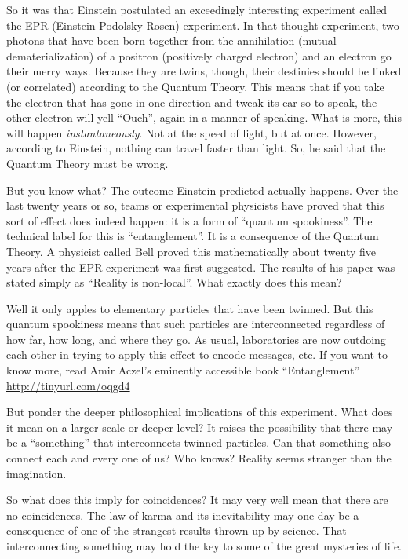 \documentclass[
  a4paper,
]{article}
\begin{document}
So it was that Einstein postulated an exceedingly interesting experiment
called the EPR (Einstein Podolsky Rosen) experiment. In that thought
experiment, two photons that have been born together from the
annihilation (mutual dematerialization) of a positron (positively
charged electron) and an electron go their merry ways. Because they are
twins, though, their destinies should be linked (or correlated)
according to the Quantum Theory. This means that if you take the
electron that has gone in one direction and tweak its ear so to speak,
the other electron will yell ``Ouch'', again in a manner of speaking.
What is more, this will happen \emph{instantaneously}. Not at the speed
of light, but at once. However, according to Einstein, nothing can
travel faster than light. So, he said that the Quantum Theory must be
wrong.

But you know what? The outcome Einstein predicted actually happens. Over
the last twenty years or so, teams or experimental physicists have
proved that this sort of effect does indeed happen: it is a form of
``quantum spookiness''. The technical label for this is
``entanglement''. It is a consequence of the Quantum Theory. A physicist
called Bell proved this mathematically about twenty five years after the
EPR experiment was first suggested. The results of his paper was stated
simply as ``Reality is non-local''. What exactly does this mean?

Well it only apples to elementary particles that have been twinned. But
this quantum spookiness means that such particles are interconnected
regardless of how far, how long, and where they go. As usual,
laboratories are now outdoing each other in trying to apply this effect
to encode messages, etc. If you want to know more, read Amir Aczel's
eminently accessible book ``Entanglement''
\url{http://tinyurl.com/oqgd4}

But ponder the deeper philosophical implications of this experiment.
What does it mean on a larger scale or deeper level? It raises the
possibility that there may be a ``something'' that interconnects twinned
particles. Can that something also connect each and every one of us? Who
knows? Reality seems stranger than the imagination.

So what does this imply for coincidences? It may very well mean that
there are no coincidences. The law of karma and its inevitability may
one day be a consequence of one of the strangest results thrown up by
science. That interconnecting something may hold the key to some of the
great mysteries of life.
\end{document}
